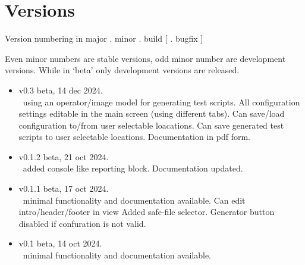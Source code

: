 \chapter{Versions}\label{Versions}

Version numbering in major . minor . build [ . bugfix ]

Even minor numbers are stable versions, odd minor number are development versions.
While in `beta' only development versions are released.

\begin{itemize}
    \item v0.3 beta, 14 dec 2024.\\
        \GS\ using an operator/image model for generating test scripts.
        All configuration settings editable in the main screen (using different tabs).
        Can save/load configuration to/from user selectable loacations.
        Can save generated test scripts to user selectable locations.
        Documentation in pdf form.
    \item v0.1.2 beta, 21 oct 2024.\\
        \GS\ added console like reporting block.
        Documentation updated.
    \item v0.1.1 beta, 17 oct 2024.\\
        \GS\ minimal functionality and documentation available.
        Can edit intro/header/footer in view Added safe-file selector.
        Generator button disabled if confuration is not valid.
    \item v0.1 beta, 14 oct 2024.\\
        \GS\ minimal functionality and documentation available.
\end{itemize}
